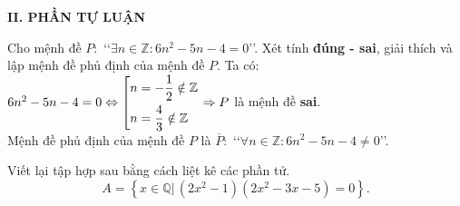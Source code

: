 \noindent\textbf{II. PHẦN TỰ LUẬN}
\begin{bt}%
	Cho mệnh đề  $P\colon$ \lq\lq$\exists n\in \mathbb{Z}:6n^2-5n-4=0$\rq\rq.
	Xét tính \textbf{đúng - sai}, giải thích và lập mệnh đề phủ định của mệnh đề $P$.
	\loigiai
	{
	Ta có: 
	$6n^2-5n-4=0\Leftrightarrow \left[\begin{aligned}& n=-\dfrac{1}{2}\notin \mathbb{Z}  \\ &n=\dfrac{4}{3}\notin \mathbb{Z} \end{aligned}\right.
	\Rightarrow P$ là mệnh đề \textbf{sai}.\\
	Mệnh đề phủ định của mệnh đề $P$ là 
	$\overline{P}\colon$ \lq\lq $\forall n\in \mathbb{Z}:6n^2-5n-4\neq 0 $\rq\rq.
	}
\end{bt}

\begin{bt}%
	Viết lại tập hợp sau bằng cách liệt kê các phần tử.
	$$A=\left\{ x\in \mathbb{Q}| \, (2x^2-1)(2x^2-3x-5)=0\right\}.$$
\end{bt}

